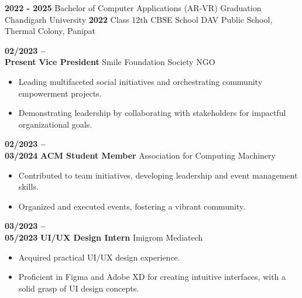 \documentclass[9pt]{developercv} %
\begin{document}
\vspace{-2pt}
\begin{entrylist}
    \entry
        {\textbf{2022 - 2025}}
        {Bachelor of Computer Applications (AR-VR)}
        {Graduation}
        {Chandigarh University}
    \entry
        {\textbf{2022}}
        {Class 12th CBSE}
        {School}
        {DAV Public School, Thermal Colony, Panipat}
\end{entrylist}

\vspace{-22pt}
\begin{entrylist}
    \entry
        {\textbf{02/2023 -- \\Present}}
        {\textbf{Vice President}}
        {Smile Foundation Society NGO}
        {\vspace{-10pt}
            \begin{itemize}[noitemsep,topsep=0pt,parsep=0pt,partopsep=0pt,leftmargin=-1pt]
                \item Leading multifaceted social initiatives and orchestrating community empowerment projects.
                \item Demonstrating leadership by collaborating with stakeholders for impactful organizational goals.
            \end{itemize}
        }
    \entry
        {\textbf{02/2023 --\\03/2024}}
        {\textbf{ACM Student Member}}
        {Association for Computing Machinery}
        {\vspace{-10pt}
            \begin{itemize}[noitemsep,topsep=0pt,parsep=0pt,partopsep=0pt,leftmargin=-1pt]
                \item Contributed to team initiatives, developing leadership and event management skills.
                \item Organized and executed events, fostering a vibrant community.
            \end{itemize}
        }
    \entry
        {\textbf{03/2023 -- \\05/2023}}
        {\textbf{UI/UX Design Intern}}
        {Imigrom Mediatech}
        {\vspace{-10pt}
            \begin{itemize}[noitemsep,topsep=0pt,parsep=0pt,partopsep=0pt,leftmargin=-1pt]
                \item Acquired practical UI/UX design experience.
                \item Proficient in Figma and Adobe XD for creating intuitive interfaces, with a solid grasp of UI design concepts.
            \end{itemize}
        }
\end{entrylist}
\end{document}
